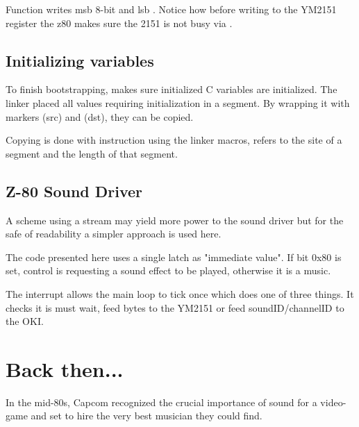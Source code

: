 Function  writes msb 8-bit  and lsb . Notice how before writing to the YM2151 register the z80 makes sure the 2151 is not busy via .





\subsection{Initializing variables}
To finish bootstrapping,  makes sure initialized C variables are initialized. The linker placed all values requiring initialization in a  segment. By wrapping it with markers  (src) and  (dst), they can be copied.



Copying is done with  instruction using the linker macros,  refers to the site of a segment and  the length of that segment.


 



\subsection{Z-80 Sound Driver}
A scheme using a stream may yield more power to the sound driver but for the safe of readability a simpler approach is used here.





The code presented here uses a single latch as "immediate value". If bit 0x80 is set, control is requesting a sound effect to be played, otherwise it is a music. 


The interrupt allows the main loop to tick once which does one of three things. It checks it is must wait, feed bytes to the YM2151 or feed soundID/channelID to the OKI.





\section{Back then...}
In the mid-80s, Capcom recognized the crucial importance of sound for a video-game and set to hire the very best musician they could find.

